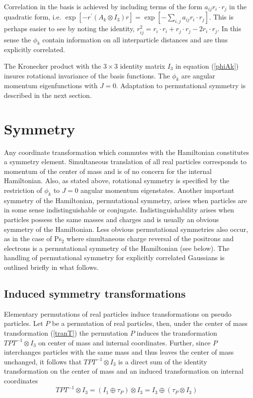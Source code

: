 \documentclass[12pt,thmsa]{article}
\begin{document}
Correlation in the basis is achieved by including terms of the form $%
a_{ij}r_i\cdot r_j$ in the quadratic form, i.e. $\exp \left[ -r^{\prime
}\left( A_k\otimes I_3\right) r\right] =\exp \left[
-\sum_{i,j}a_{ij}r_i\cdot r_j\right] $. This is perhaps easier to see by
noting the identity, $r_{ij}^2=r_i\cdot r_i+r_j\cdot r_j-2r_i\cdot r_j$. In
this sense the $\phi _k$ contain information on all interparticle distances
and are thus explicitly correlated.

The Kronecker product with the $3\times 3$ identity matrix $I_3$ in equation
(\ref{phiAk}) insures rotational invariance of the basis functions. The $%
\phi _k$ are angular momentum eigenfunctions with $J=0$. Adaptation to
permutational symmetry is described in the next section.

\section{Symmetry}

Any coordinate transformation which commutes with the Hamiltonian
constitutes a symmetry element. Simultaneous translation of all real
particles corresponds to momentum of the center of mass and is of no concern
for the internal Hamiltonian. Also, as stated above, rotational symmetry is
specified by the restriction of $\phi _k$ to $J=0$ angular momentum
eigenstates. Another important symmetry of the Hamiltonian, permutational
symmetry, arises when particles are in some sense indistinguishable or
conjugate. Indistinguishability arises when particles possess the same
masses and charges and is usually an obvious symmetry of the Hamiltonian.
Less obvious permutational symmetries also occur, as in the case of Ps$_2$
where simultaneous charge reversal of the positrons and electrons is a
permutational symmetry of the Hamiltonian (see below). The handling of
permutational symmetry for explicitly correlated Gaussians is outlined
briefly in what follows.

\subsection{Induced symmetry transformations}

Elementary permutations of real particles induce transformations on pseudo
particles. Let $P$ be a permutation of real particles, then, under the
center of mass transformation (\ref{tranT}) the permutation $P$ induces the
transformation $TPT^{-1}\otimes I_3$ on center of mass and internal
coordinates. Further, since $P$ interchanges particles with the same mass
and thus leaves the center of mass unchanged, it follows that $%
TPT^{-1}\otimes I_3$ is a direct sum of the identity transformation on the
center of mass and an induced transformation on internal coordinates 
\begin{equation}
TPT^{-1}\otimes I_3=\left( I_1\oplus \tau _P\right) \otimes I_3=I_3\oplus
\left( \tau _P\otimes I_3\right)  \label{TPT}
\end{equation}
\end{document}
